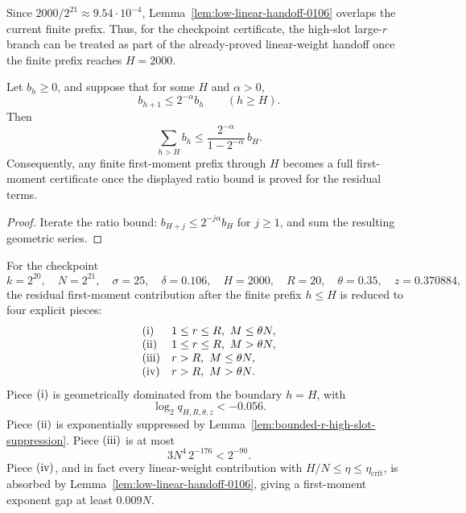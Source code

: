 Since \(2000/2^{21}\approx9.54\cdot10^{-4}\), Lemma~\ref{lem:low-linear-handoff-0106} overlaps the current finite
prefix.  Thus, for the checkpoint certificate, the high-slot large-\(r\) branch can be treated as part of the
already-proved linear-weight handoff once the finite prefix reaches \(H=2000\).

\begin{lemma}
\label{lem:geometric-residual-certificate}
Let \(b_h\ge0\), and suppose that for some \(H\) and \(\alpha>0\),
\[
b_{h+1}\le 2^{-\alpha}b_h
\qquad(h\ge H).
\]
Then
\[
\sum_{h>H}b_h
\le
\frac{2^{-\alpha}}{1-2^{-\alpha}}\,b_H.
\]
Consequently, any finite first-moment prefix through \(H\) becomes a full first-moment certificate once the displayed
ratio bound is proved for the residual terms.
\end{lemma}

\begin{proof}
Iterate the ratio bound:
\(b_{H+j}\le 2^{-j\alpha}b_H\) for \(j\ge1\), and sum the resulting geometric series.
\end{proof}

\begin{lemma}[Checkpoint residual split at \(\delta=0.106\)]
\label{lem:checkpoint-residual-split-0106}
For the checkpoint
\[
k=2^{20},\quad N=2^{21},\quad \sigma=25,\quad \delta=0.106,\quad
H=2000,\quad R=20,\quad \theta=0.35,\quad z=0.370884,
\]
the residual first-moment contribution after the finite prefix \(h\le H\) is reduced to four explicit pieces:
\[
\begin{array}{ll}
\text{\rm (i)} & 1\le r\le R,\ M\le\theta N,\\
\text{\rm (ii)} & 1\le r\le R,\ M>\theta N,\\
\text{\rm (iii)} & r>R,\ M\le\theta N,\\
\text{\rm (iv)} & r>R,\ M>\theta N.
\end{array}
\]
Piece \({\rm (i)}\) is geometrically dominated from the boundary \(h=H\), with
\[
\log_2 q_{H,R,\theta,z}<-0.056.
\]
Piece \({\rm (ii)}\) is exponentially suppressed by Lemma~\ref{lem:bounded-r-high-slot-suppression}.  Piece
\({\rm (iii)}\) is at most
\[
3N^4\,2^{-176}<2^{-90}.
\]
Piece \({\rm (iv)}\), and in fact every linear-weight contribution with
\(H/N\le\eta\le\eta_{\mathrm{crit}}\), is absorbed by Lemma~\ref{lem:low-linear-handoff-0106}, giving a first-moment exponent gap at
least \(0.009N\).
\end{lemma}

